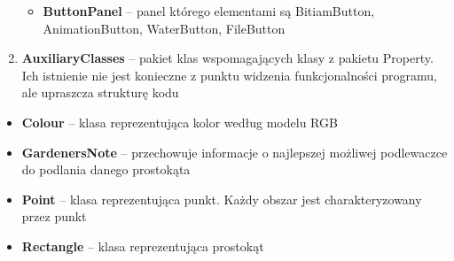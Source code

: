 \documentclass[12pt]{article}
\renewcommand{\_}{\kern-1.5pt\textunderscore\kern-1.5pt}
\begin{document}
\begin{enumerate}
\begin{itemize}
	\item \textbf{ButtonPanel} – panel którego elementami są BitiamButton, AnimationButton, WaterButton, FileButton
\end{itemize}\par


\vspace{\baselineskip}
	\item \textbf{AuxiliaryClasses} – pakiet klas wspomagających klasy z pakietu Property. Ich istnienie nie jest konieczne z punktu widzenia funkcjonalności programu, ale upraszcza strukturę kodu
\end{enumerate}\par

\begin{itemize}
	\item \textbf{Colour} – klasa reprezentująca kolor według modelu RGB\par

	\item \textbf{GardenersNote} – przechowuje informacje o najlepszej możliwej podlewaczce do podlania danego prostokąta\par

	\item \textbf{Point} – klasa reprezentująca punkt. Każdy obszar jest charakteryzowany przez punkt\par

	\item \textbf{Rectangle} – klasa reprezentująca prostokąt\\

\end{itemize}\par


\vspace{\baselineskip}

\vspace{\baselineskip}

\vspace{\baselineskip}

\vspace{\baselineskip}

\vspace{\baselineskip}

\vspace{\baselineskip}

\vspace{\baselineskip}

\vspace{\baselineskip}

\vspace{\baselineskip}

\vspace{\baselineskip}

\vspace{\baselineskip}

\printbibliography
\end{document}
